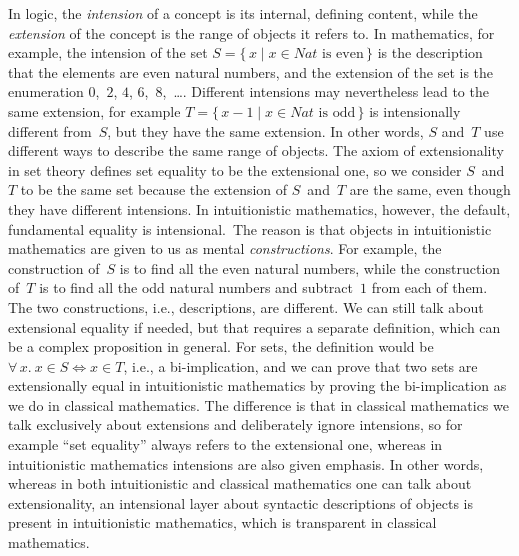 In logic, the \emph{intension} of a concept is its internal, defining content, while the \emph{extension} of the concept is the range of objects it refers to.
In mathematics, for example, the intension of the set $S = \{\, x \mid \text{$x \in Nat$ is even} \,\}$ is the description that the elements are even natural numbers, and the extension of the set is the enumeration $0$,~$2$, $4$, $6$,~$8$,~\ldots.
Different intensions may nevertheless lead to the same extension, for example $T = \{\, x - 1 \mid \text{$x \in Nat$ is odd} \,\}$ is intensionally different from~$S$, but they have the same extension.
In other words, $S$ and~$T$ use different ways to describe the same range of objects.
The axiom of extensionality in set theory defines set equality to be the extensional one, so we consider $S$~and~$T$ to be the same set because the extension of $S$~and~$T$ are the same, even though they have different intensions.
In intuitionistic mathematics, however, the default, fundamental equality is intensional.\
The reason is that objects in intuitionistic mathematics are given to us as mental \emph{constructions}.
For example, the construction of~$S$ is to find all the even natural numbers, while the construction of~$T$ is to find all the odd natural numbers and subtract~$1$ from each of them.
The two constructions, i.e., descriptions, are different.
We can still talk about extensional equality if needed, but that requires a separate definition, which can be a complex proposition in general.
For sets, the definition would be $\forall\,x.~ x \in S \Leftrightarrow x \in T$, i.e., a bi-implication, and we can prove that two sets are extensionally equal in intuitionistic mathematics by proving the bi-implication as we do in classical mathematics.
The difference is that in classical mathematics we talk exclusively about extensions and deliberately ignore intensions, so for example ``set equality'' always refers to the extensional one, whereas in intuitionistic mathematics intensions are also given emphasis.
In other words, whereas in both intuitionistic and classical mathematics one can talk about extensionality, an intensional layer about syntactic descriptions of objects is present in intuitionistic mathematics, which is transparent in classical mathematics.

